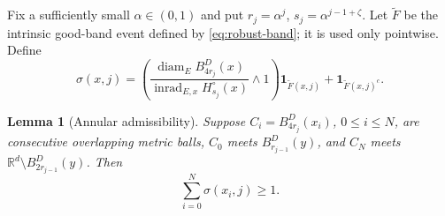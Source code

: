 \documentclass[11pt,reqno]{amsart}
\theoremstyle{plain}
\newtheorem{lemma}[theorem]{Lemma}
\theoremstyle{definition}
\theoremstyle{remark}
\newcommand{\R}{\mathbb R}
\newcommand{\diam}{\operatorname{diam}}
\newcommand{\inrad}{\operatorname{inrad}}
\newcommand{\1}{\mathbf{1}}
\newcommand{\bd}{B^{D}}
\begin{document}
Fix a sufficiently small $\alpha\in(0,1)$ and put $r_j=\alpha^j$, $s_j=\alpha^{j-1+\zeta}$. Let $\widetilde F$ be the intrinsic good-band event defined by \eqref{eq:robust-band}; it is used only pointwise. Define
\begin{equation}\label{eq:sigma}
\sigma(x,j)=\left(\frac{\diam_E\bd_{4r_j}(x)}{\inrad_{E,x}H_{s_j}^\circ(x)}\wedge1\right)\1_{\widetilde F(x,j)}
+\1_{\widetilde F(x,j)^c}.
\end{equation}

\begin{lemma}[Annular admissibility]\label{lem:admissible}
Suppose $C_i=\bd_{4r_j}(x_i)$, $0\le i\le N$, are consecutive overlapping metric balls, $C_0$ meets $\bd_{r_{j-1}}(y)$, and $C_N$ meets $\R^d\setminus\bd_{2r_{j-1}}(y)$. Then
\begin{equation}\label{eq:admissible}
\sum_{i=0}^N\sigma(x_i,j)\ge1.
\end{equation}
\end{lemma}
\end{document}

